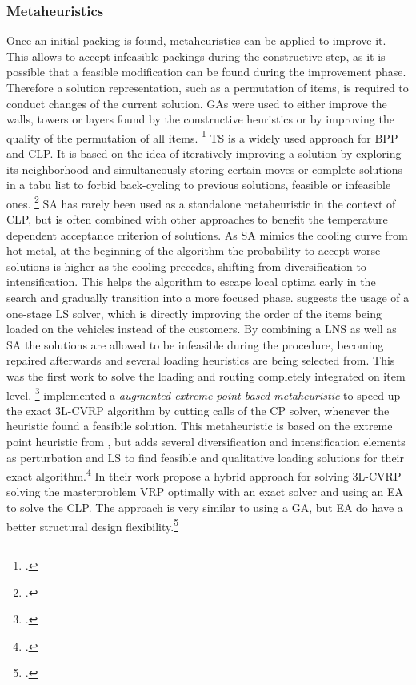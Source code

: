 \subsubsection{Metaheuristics}
Once an initial packing is found, metaheuristics can be applied to improve it.
This allows to accept infeasible packings during the constructive step,
as it is possible that a feasible modification can be found during the improvement phase.
Therefore a solution representation, such as a permutation of items, is required
to conduct changes of the current solution. \Glspl{GA} were
used to either improve the walls, towers or layers found by the constructive heuristics
or by improving the quality of the permutation of all items. \footcite[cf.][]{gehring_genetic_1997}
\Gls{TS} is a widely used approach for \gls{BPP} and \gls{CLP}. It is based on
the idea of iteratively improving a solution by exploring its neighborhood and simultaneously
storing certain moves or complete solutions in a tabu list to forbid back-cycling to
previous solutions, feasible or infeasible ones. \footcite[cf.][pp. 344--345]{gendreau_tabu_2006}
\Gls{SA} has rarely been used as a standalone metaheuristic in the context of \gls{CLP}, but is often
combined with other approaches to benefit the temperature dependent acceptance criterion of
solutions. As \gls{SA} mimics the cooling curve from hot metal, at the beginning of the algorithm the probability
to accept worse solutions is higher as the cooling precedes, shifting from diversification to
intensification. This helps the algorithm to escape local optima
early in the search and gradually transition into a more focused phase. \cite{ceschia_local_2013} suggests
the usage of a one-stage \gls{LS} solver, which is directly improving the order of the items being
loaded on the vehicles instead of the customers. By combining a \gls{LNS} as
well as \gls{SA} the solutions are allowed to be infeasible during the procedure, becoming repaired afterwards
and several loading heuristics are being selected from. This was the first work to
solve the loading and routing completely integrated on item level. \footcite[cf.][pp. 1142-1145]{ceschia_local_2013}
\cite{tamke_branch-and-cut_2024} implemented a \textit{augmented extreme point-based metaheuristic}
to speed-up the exact \gls{3L-CVRP} algorithm by cutting calls of the \gls{CP} solver, whenever the heuristic
found a feasibile solution. This metaheuristic is based on the extreme point heuristic from \cite{zhang_evolutionary_2015},
but adds several diversification and intensification elements as perturbation and \gls{LS} to find
feasible and qualitative loading solutions for their exact algorithm.\footcite[cf.][pp. 11-13]{tamke_branch-and-cut_2024}
In their work \cite{kucuk_constraint_2022} propose a hybrid approach for solving \gls{3L-CVRP} solving the
masterproblem \gls{VRP} optimally with an exact solver and using an \gls{EA}
to solve the \gls{CLP}. The approach is very similar to using a \gls{GA}, but \gls{EA}
do have a better structural design flexibility.\footcite[cf.][pp. 5--8]{kucuk_constraint_2022}

